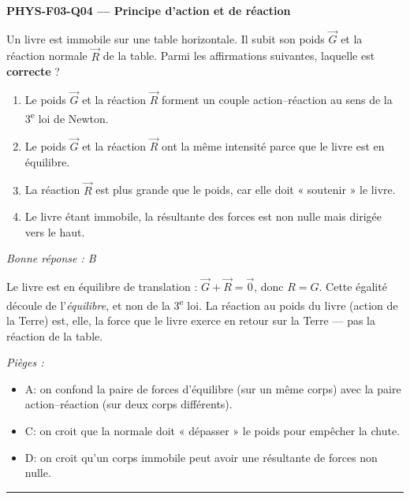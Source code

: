 \documentclass[11pt,a4paper]{article}
\newcommand{\vv}[1]{\vec{#1}}\newcommand{\ds}{\displaystyle}
\begin{document}
\noindent\textbf{PHYS-F03-Q04 --- Principe d'action et de réaction}\par
Un livre est immobile sur une table horizontale. Il subit son poids $\vv G$ et la réaction normale
$\vv R$ de la table. Parmi les affirmations suivantes, laquelle est \textbf{correcte} ?
\begin{enumerate}[label=\Alph*)]
\item Le poids $\vv G$ et la réaction $\vv R$ forment un couple action--réaction au sens de la 3\textsuperscript{e} loi de Newton.
\item Le poids $\vv G$ et la réaction $\vv R$ ont la même intensité parce que le livre est en équilibre.
\item La réaction $\vv R$ est plus grande que le poids, car elle doit « soutenir » le livre.
\item Le livre étant immobile, la résultante des forces est non nulle mais dirigée vers le haut.
\end{enumerate}
\textit{Bonne réponse : B}\par
Le livre est en équilibre de translation : $\vv G + \vv R = \vv 0$, donc $R = G$. Cette égalité découle
de l'\emph{équilibre}, et non de la 3\textsuperscript{e} loi. La réaction au poids du livre (action de la Terre) est,
elle, la force que le livre exerce en retour sur la Terre — pas la réaction de la table.\par
\textit{Pièges :}
\begin{itemize}
\item A: on confond la paire de forces d'équilibre (sur un même corps) avec la paire action--réaction (sur deux corps différents).
\item C: on croit que la normale doit « dépasser » le poids pour empêcher la chute.
\item D: on croit qu'un corps immobile peut avoir une résultante de forces non nulle.
\end{itemize}
\vspace{8pt}\hrule\vspace{8pt}
\end{document}
